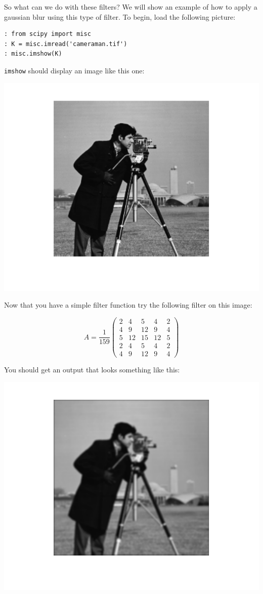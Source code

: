 So what can we do with these filters? We will show an example of how to apply a gaussian blur using this type of filter. To begin, load the following picture:

\begin{lstlisting}
: from scipy import misc
: K = misc.imread('cameraman.tif')
: misc.imshow(K)
\end{lstlisting}

{\tt imshow} should display an image like this one:

\includegraphics{./Figures/CameramanClean.pdf}

Now that you have a simple filter function try the following filter on this image:

\[
A = \frac{1}{159}\begin{pmatrix}
2&4&5&4&2\\
4&9&12&9&4\\
5&12&15&12&5\\
2&4&5&4&2\\
4&9&12&9&4
\end{pmatrix}
\]

You should get an output that looks something like this:

\includegraphics{./Figures/CameramanBlur.pdf}

